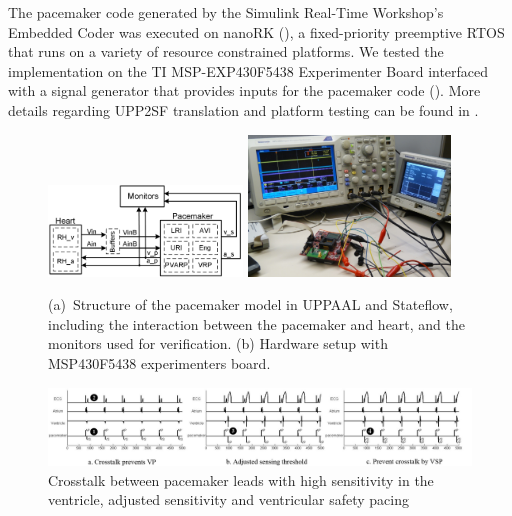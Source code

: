 The pacemaker code generated by the Simulink Real-Time Workshop's Embedded Coder was executed on nanoRK (\cite{nanork}), a fixed-priority preemptive RTOS that runs on a variety of resource constrained platforms. We tested the implementation on the TI MSP-EXP430F5438 Experimenter Board interfaced with a signal generator that provides inputs for the pacemaker code (). More details regarding UPP2SF translation and platform testing can be found in \cite{TECS}.

\begin{figure}[!t]
\centering
		\subfigure 
		{			
		\includegraphics[width=0.46\textwidth]{figs/HM_PM_newMon.png}
		\label{fig:hm_pm}
		}
		\subfigure 
		{	
			\includegraphics[width=0.48\textwidth]{figs/HW_setup1.png}
			\label{fig:PM_timer}
		} 
\caption{(a)~Structure of the pacemaker model in UPPAAL and Stateflow, including the interaction between the pacemaker and heart, and the monitors used for verification. (b) Hardware setup with MSP430F5438 experimenters board.}
\label{fig:setup}
\end{figure} 

\begin{figure}[b]
\center
\vspace{-10pt}
		\includegraphics[width=\textwidth]{figs/crosstalk_all.pdf}
\vspace{-20pt}
\caption{Crosstalk between pacemaker leads with high sensitivity in the ventricle, adjusted sensitivity and ventricular safety pacing}
\label{fig:crosstalk}
\vspace{-15pt}
\end{figure}

